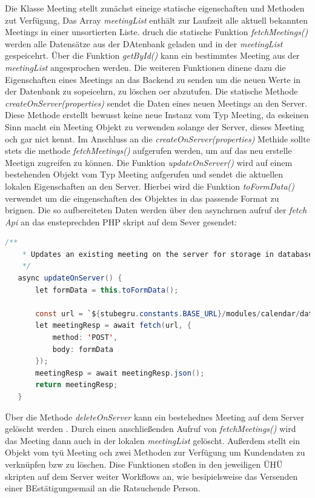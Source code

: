 \documentclass[12pt]{article}
\begin{document}
Die Klasse Meeting stellt zunächst eineige statische eigenschaften und Methoden zut Verfügung, Das Array \textit{meetingList} enthält zur Laufzeit alle aktuell bekannten Meetings in einer unsortierten Liste. druch die statische Funktion \textit{fetchMeetings()} werden alle Datensätze aus der DAtenbank geladen und in der \textit{meetingList} gespeicehrt. Über die Funktion \textit{getById()} kann ein bestimmtes Meeting aus der \textit{meetingList} angesprochen werden.
Die weiteren Funktionen dinene dazu die Eigenschaften eines Meetings an das Backend zu senden um die neuen Werte in der Datenbank zu sopeicehrn, zu löschen oer abzutufen.
Die statische Methode \textit{createOnServer(properties)} sendet die Daten eines neuen Meetings an den Server. Diese Methode erstellt bewusst keine neue Instanz vom Typ Meeting, da eskeinen Sinn macht ein Meeting Objekt zu verwenden solange der Server, dieses Meeting och gar nict kennt. Im Anschluss an die \textit{createOnServer(properties)} Methide sollte stets die methode \textit{fetchMeetings()} aufgerufen werden, um auf das neu erstelle Meetign zugreifen zu können.
Die Funktion \textit{updateOnServer()} wird auf einem bestehenden Objekt vom Typ Meeting aufgerufen und sendet die aktuellen lokalen Eigenschaften an den Server. Hierbei wird die Funktion \textit{toFormData()} verwendet um die eingenschaften des Objektes in das passende Format zu brignen. Die so aufbereiteten Daten werden über den asynchrnen aufruf der \textit{fetch Api}\cite{fetchAPI} an das ensteprechden PHP skript auf dem Sever gesendet:


\begin{lstlisting}[language=Java]
    /**
    * Updates an existing meeting on the server for storage in database
    */
   async updateOnServer() {
       let formData = this.toFormData();

       const url = `${stubegru.constants.BASE_URL}/modules/calendar/dates/update_calendar_date.php`;
       let meetingResp = await fetch(url, {
           method: 'POST',
           body: formData
       });
       meetingResp = await meetingResp.json();
       return meetingResp;
   }
\end{lstlisting}

Über die Methode \textit{deleteOnServer} kann ein bestehednes Meeting auf dem Server gelöscht werden . Durch einen anschließenden Aufruf von \textit{fetchMeetings()} wird das Meeting dann auch in der lokalen \textit{meetingList} gelöscht. Außerdem stellt ein Objekt vom tyü Meeting och zwei Methoden zur Verfügung um Kundendaten zu verknüpfen bzw zu löschen. Dise Funktionen stoßen in den jeweiligen ÜHÜ skripten auf dem Server weiter Workflows an, wie besipielsweise das Versenden einer BEstätigungsemail an die Ratsuchende Person.
\end{document}
